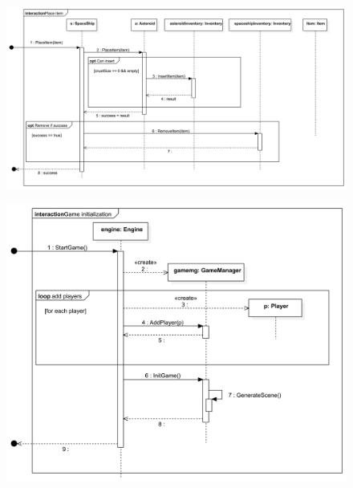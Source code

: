\begin{figure}[H] 
\centering 
\includegraphics[width=1\textwidth]{docs/3_Project/svg/Design Model!Place resource in inventory!successful placement!Place item_24.png} 
\end{figure} 

\begin{figure}[H] 
\centering 
\includegraphics[width=1\textwidth]{docs/3_Project/svg/Design Model!Game Init!Game initialization!Game initialization_25.png} 
\end{figure} 

